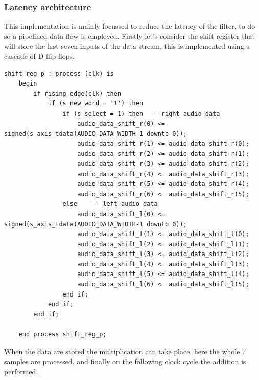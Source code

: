 \documentclass[11pt, a4paper]{article}
\begin{document}
\subsubsection{Latency architecture}
This implementation is mainly focussed to reduce the latency of the filter, to do so a pipelined data flow is employed.
Firstly let's consider the shift register that will store the last seven inputs of the data stream, this is implemented using a cascade of D flip-flops.
\begin{lstlisting}[style={VHDL-style}]
shift_reg_p : process (clk) is
    begin
        if rising_edge(clk) then
            if (s_new_word = '1') then
                if (s_select = 1) then  -- right audio data 
                    audio_data_shift_r(0) <= signed(s_axis_tdata(AUDIO_DATA_WIDTH-1 downto 0));
                    audio_data_shift_r(1) <= audio_data_shift_r(0);
                    audio_data_shift_r(2) <= audio_data_shift_r(1);
                    audio_data_shift_r(3) <= audio_data_shift_r(2);
                    audio_data_shift_r(4) <= audio_data_shift_r(3);
                    audio_data_shift_r(5) <= audio_data_shift_r(4);
                    audio_data_shift_r(6) <= audio_data_shift_r(5);
                else    -- left audio data
                    audio_data_shift_l(0) <= signed(s_axis_tdata(AUDIO_DATA_WIDTH-1 downto 0));
                    audio_data_shift_l(1) <= audio_data_shift_l(0);
                    audio_data_shift_l(2) <= audio_data_shift_l(1);
                    audio_data_shift_l(3) <= audio_data_shift_l(2);
                    audio_data_shift_l(4) <= audio_data_shift_l(3);
                    audio_data_shift_l(5) <= audio_data_shift_l(4);
                    audio_data_shift_l(6) <= audio_data_shift_l(5);
                end if;
            end if;
        end if;

    end process shift_reg_p;
\end{lstlisting}

When the data are stored the multiplication can take place, here the whole 7 samples are processed, and finally on the following clock cycle the addition is performed.
\end{document}
